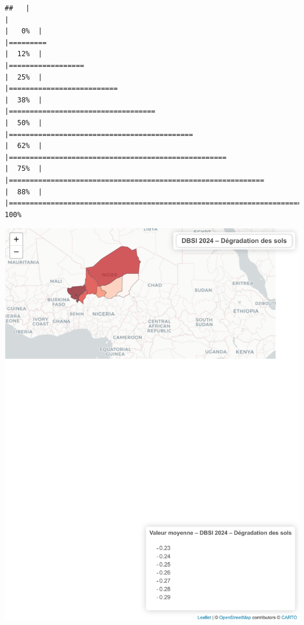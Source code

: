 \documentclass[
]{book}
\begin{document}
\begin{verbatim}
##   |                                                                              |                                                                      |   0%  |                                                                              |=========                                                             |  12%  |                                                                              |==================                                                    |  25%  |                                                                              |==========================                                            |  38%  |                                                                              |===================================                                   |  50%  |                                                                              |============================================                          |  62%  |                                                                              |====================================================                  |  75%  |                                                                              |=============================================================         |  88%  |                                                                              |======================================================================| 100%
\end{verbatim}

\includegraphics{Atlas-Spectral-Sahel_files/figure-latex/stress-dbsi-1.pdf}
\end{document}
